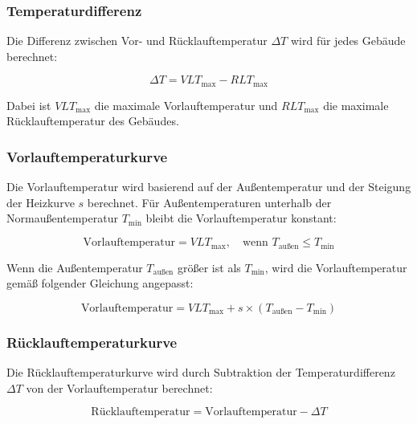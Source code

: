 \documentclass[a4paper,12pt]{article}
\begin{document}
\subsubsection{Temperaturdifferenz}
Die Differenz zwischen Vor- und Rücklauftemperatur \( \Delta T \) wird für jedes Gebäude berechnet:

\[
\Delta T = VLT_{\text{max}} - RLT_{\text{max}}
\]

Dabei ist \( VLT_{\text{max}} \) die maximale Vorlauftemperatur und \( RLT_{\text{max}} \) die maximale Rücklauftemperatur des Gebäudes.

\subsubsection{Vorlauftemperaturkurve}
Die Vorlauftemperatur wird basierend auf der Außentemperatur und der Steigung der Heizkurve \( s \) berechnet. Für Außentemperaturen unterhalb der Normaußentemperatur \( T_{\text{min}} \) bleibt die Vorlauftemperatur konstant:

\[
\text{Vorlauftemperatur} = VLT_{\text{max}}, \quad \text{wenn } T_{\text{außen}} \leq T_{\text{min}}
\]

Wenn die Außentemperatur \( T_{\text{außen}} \) größer ist als \( T_{\text{min}} \), wird die Vorlauftemperatur gemäß folgender Gleichung angepasst:

\[
\text{Vorlauftemperatur} = VLT_{\text{max}} + s \times (T_{\text{außen}} - T_{\text{min}})
\]

\subsubsection{Rücklauftemperaturkurve}
Die Rücklauftemperaturkurve wird durch Subtraktion der Temperaturdifferenz \( \Delta T \) von der Vorlauftemperatur berechnet:

\[
\text{Rücklauftemperatur} = \text{Vorlauftemperatur} - \Delta T
\]




\end{document}
